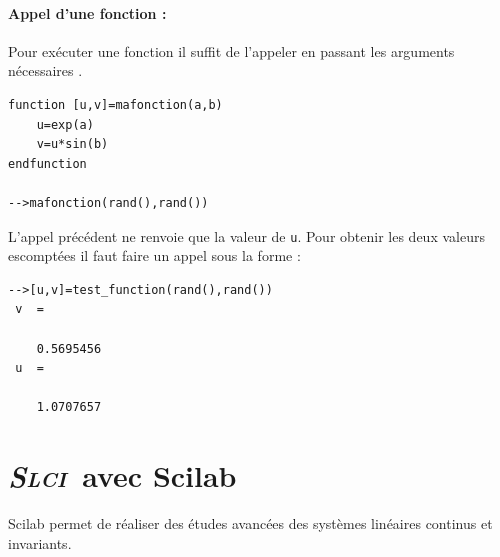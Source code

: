 \paragraph{Appel d'une fonction :}
Pour exécuter une fonction il suffit de l'appeler en passant les arguments nécessaires .
\begin{code}
\begin{verbatim}
function [u,v]=mafonction(a,b)
    u=exp(a)
    v=u*sin(b)
endfunction

-->mafonction(rand(),rand())
\end{verbatim}
\end{code}
L'appel précédent ne renvoie que la valeur de \verb?u?. 
Pour obtenir les deux valeurs escomptées il faut faire un appel sous la forme  :
\begin{code}
\begin{verbatim}
-->[u,v]=test_function(rand(),rand())
 v  =
 
    0.5695456  
 u  =
 
    1.0707657  
\end{verbatim}
\end{code}



\newpage
\section{\emph{{\scshape Slci}}~avec Scilab}

Scilab permet de réaliser des études avancées des systèmes linéaires continus et invariants.


